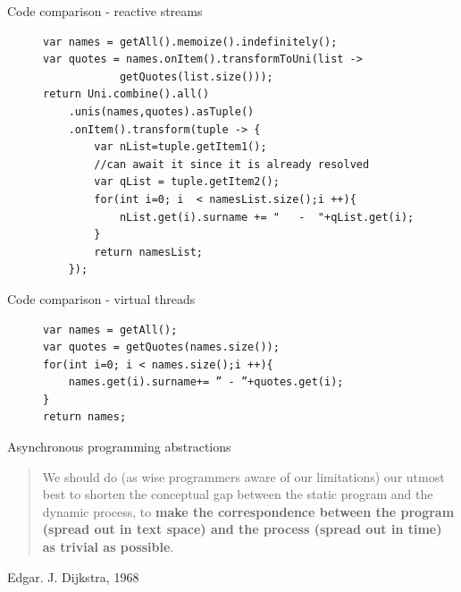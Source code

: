 \documentclass{beamer}
\begin{document}
\begin{frame}[fragile]{Code comparison - reactive streams}
    \begin{figure}
        \begin{lstlisting}
var names = getAll().memoize().indefinitely();
var quotes = names.onItem().transformToUni(list -> 
            getQuotes(list.size()));
return Uni.combine().all()
    .unis(names,quotes).asTuple()
    .onItem().transform(tuple -> {
        var nList=tuple.getItem1();
        //can await it since it is already resolved
        var qList = tuple.getItem2();
        for(int i=0; i  < namesList.size();i ++){
            nList.get(i).surname += "   -  "+qList.get(i);
        }
        return namesList;
    });
        \end{lstlisting}
    \end{figure}
\end{frame}
\begin{frame}[fragile]{Code comparison - virtual threads}
    \begin{figure}
        \begin{lstlisting}
var names = getAll();
var quotes = getQuotes(names.size());
for(int i=0; i < names.size();i ++){
    names.get(i).surname+= ” - ”+quotes.get(i);
}
return names;
        \end{lstlisting}
    \end{figure}
\end{frame}
\begin{frame}{Asynchronous programming abstractions}
    \begin{quote}
        We should do (as wise programmers aware of our limitations) our utmost best to shorten the conceptual gap between the static program and the dynamic process, to \textbf{make the correspondence between the program (spread out in text space) and the process (spread out in time) as trivial as possible}.
    \end{quote}
    Edgar. J. Dijkstra, 1968
\end{frame}
\end{document}
